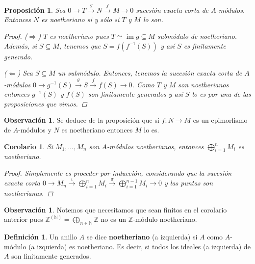 \documentclass[12pt]{book}
\newtheorem{prop}[teo]{Proposición}
\newtheorem{cor}[teo]{Corolario}
\theoremstyle{definition}
\newtheorem{obs}[teo]{Observación}
\newtheorem{defn}[teo]{Definición}
\newcommand{\ZZ}{\mathbb{Z}}      %
\newcommand{\NN}{\mathbb{N}}
\DeclareMathOperator{\im}{im}
\begin{document}
\begin{prop}
Sea $0\longrightarrow T\stackrel{g}{\longrightarrow} N\stackrel{f}{\longrightarrow} M\longrightarrow 0$ sucesión exacta corta de $A$-módulos. Entonces $N$ es noetheriano si y sólo si $T$ y $M$ lo son.
\begin{proof}
($\Longrightarrow$) $T$ es noetheriano pues $T\simeq \im g\subseteq M$ submódulo de noetheriano. Además, si $S\subseteq M$, tenemos que $S=f(f^{-1}(S))$ y así $S$ es finitamente generado.

($\Longleftarrow$) Sea $S\subseteq M$ un submódulo. Entonces, tenemos la sucesión exacta corta de $A$-módulos $0\longrightarrow g^{-1}(S)\stackrel{g}{\longrightarrow} S\stackrel{f}{\longrightarrow} f(S)\longrightarrow 0$. Como $T$ y $M$ son noetherianos entonces $g^{-1}(S)$ y $f(S)$ son finitamente generados y así $S$ lo es por una de las proposiciones que vimos.

\end{proof}
\end{prop}

\begin{obs}
Se deduce de la proposición que si $f:N\to M$ es un epimorfismo de $A$-módulos y $N$ es noetheriano entonces $M$ lo es.
\end{obs}

\begin{cor}
Si $M_1,\ldots , M_n$ son $A$-módulos noetherianos, entonces $\displaystyle\bigoplus_{i=1}^{n} M_i$ es noetheriano.
\begin{proof}
Simplemente es proceder por inducción, considerando que la sucesión exacta corta $0\longrightarrow M_n \stackrel{\iota}{\longrightarrow}\displaystyle\bigoplus_{i=1}^{n} M_i \stackrel{\pi}{\longrightarrow} \displaystyle\bigoplus_{i=1}^{n-1} M_i \longrightarrow 0$ y las puntas son noetherianas.
\end{proof}
\end{cor}

\begin{obs}
Notemos que necesitamos que sean finitos en el corolario anterior pues $\ZZ^{(\NN)} = \displaystyle\bigoplus_{n\in\NN}\ZZ$ no es un $\ZZ$-módulo noetheriano.
\end{obs}

\begin{defn}
Un anillo $A$ se dice \textbf{noetheriano} (a izquierda) si $A$ como $A$-módulo (a izquierda) es noetheriano. Es decir, si todos los ideales (a izquierda) de $A$ son finitamente generados.
\end{defn}
\end{document}
